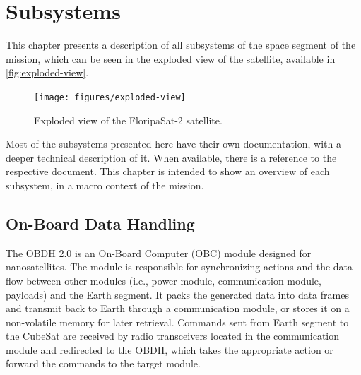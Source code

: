 %
%
%
%
%

%
%
%
%
%
%

\chapter{Subsystems} \label{ch:subsystems}

This chapter presents a description of all subsystems of the space segment of the mission, which can be seen in the exploded view of the satellite, available in \autoref{fig:exploded-view}.

\begin{figure}[!ht]
    \begin{center}
        \texttt{[image: figures/exploded-view]}
        \caption{Exploded view of the FloripaSat-2 satellite.}
        \label{fig:exploded-view}
    \end{center}
\end{figure}

Most of the subsystems presented here have their own documentation, with a deeper technical description of it. When available, there is a reference to the respective document. This chapter is intended to show an overview of each subsystem, in a macro context of the mission.

\section{On-Board Data Handling}

The OBDH 2.0 is an On-Board Computer (OBC) module designed for nanosatellites. The module is responsible for synchronizing actions and the data flow between other modules (i.e., power module, communication module, payloads) and the Earth segment. It packs the generated data into data frames and transmit back to Earth through a communication module, or stores it on a non-volatile memory for later retrieval. Commands sent from Earth segment to the CubeSat are received by radio transceivers located in the communication module and redirected to the OBDH, which takes the appropriate action or forward the commands to the target module.

